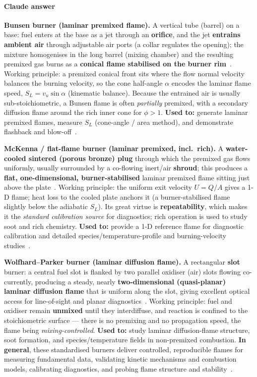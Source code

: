 {\color{istblue}
\paragraph{Claude answer}
\textbf{Bunsen burner (laminar premixed flame).} A vertical tube (barrel) on a base: fuel enters at the base as a jet through an \textbf{orifice}, and the jet \textbf{entrains ambient air} through adjustable air ports (a collar regulates the opening); the mixture homogenises in the long barrel (mixing chamber) and the resulting premixed gas burns as a \textbf{conical flame stabilised on the burner rim}~\cite{lecture5,mishra2014experimental}. Working principle: a premixed conical front sits where the flow normal velocity balances the burning velocity, so the cone half-angle $\alpha$ encodes the laminar flame speed, $S_L = v_u \sin\alpha$ (kinematic balance). Because the entrained air is usually sub-stoichiometric, a Bunsen flame is often \emph{partially} premixed, with a secondary diffusion flame around the rich inner cone for $\phi>1$. \textbf{Used to:} generate laminar premixed flames, measure $S_L$ (cone-angle / area method), and demonstrate flashback and blow-off~\cite{lecture5}.

\textbf{McKenna / flat-flame burner (laminar premixed, incl.\ rich).} A \textbf{water-cooled sintered (porous bronze) plug} through which the premixed gas flows uniformly, usually surrounded by a co-flowing inert/air \textbf{shroud}; this produces a \textbf{flat, one-dimensional, burner-stabilised} laminar premixed flame sitting just above the plate~\cite{lecture5}. Working principle: the uniform exit velocity $U = Q/A$ gives a 1-D flame; heat loss to the cooled plate anchors it (a burner-stabilised flame slightly below the adiabatic $S_L$). Its great virtue is \textbf{repeatability}, which makes it the \emph{standard calibration source} for diagnostics; rich operation is used to study soot and rich chemistry. \textbf{Used to:} provide a 1-D reference flame for diagnostic calibration and detailed species/temperature-profile and burning-velocity studies~\cite{lecture5,warnatz2006combustion}.

\textbf{Wolfhard--Parker burner (laminar diffusion flame).} A rectangular \textbf{slot} burner: a central fuel slot is flanked by two parallel oxidiser (air) slots flowing co-currently, producing a steady, nearly \textbf{two-dimensional (quasi-planar) laminar diffusion flame} that is uniform along the slot, giving excellent optical access for line-of-sight and planar diagnostics~\cite{warnatz2006combustion,glassman2014combustion}. Working principle: fuel and oxidiser remain \textbf{unmixed} until they interdiffuse, and reaction is confined to the stoichiometric surface --- there is no premixing and no propagation speed, the flame being \emph{mixing-controlled}. \textbf{Used to:} study laminar diffusion-flame structure, soot formation, and species/temperature fields in non-premixed combustion. \textbf{In general}, these standardised burners deliver controlled, reproducible flames for measuring fundamental data, validating kinetic mechanisms and combustion models, calibrating diagnostics, and probing flame structure and stability~\cite{lecture5,mishra2014experimental,warnatz2006combustion}.
}




